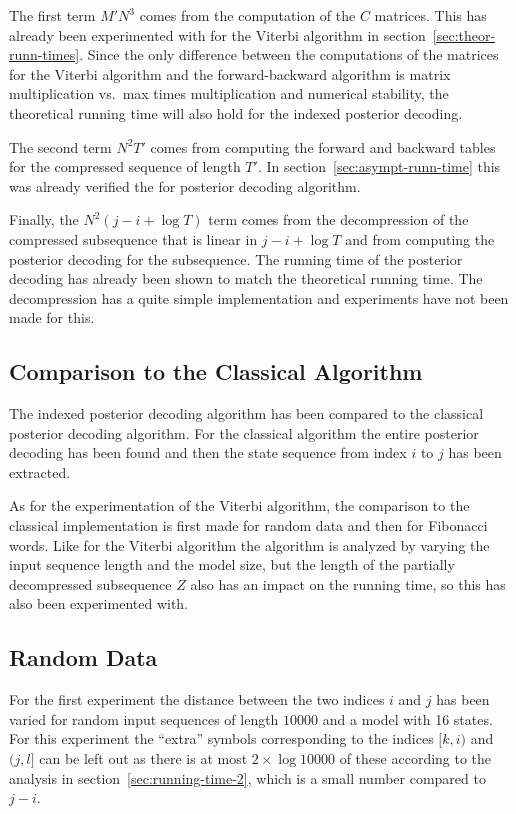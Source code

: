 The first term $M' N^3$ comes from the computation of the $C$ matrices. This
has already been experimented with for the Viterbi algorithm in
section~\ref{sec:theor-runn-times}. Since the only difference between the
computations of the matrices for the Viterbi algorithm and the forward-backward
algorithm is matrix multiplication vs.\ max times multiplication and numerical
stability, the theoretical running time will also hold for the indexed posterior
decoding.

The second term $N^2 T'$ comes from computing the forward and backward tables
for the compressed sequence of length $T'$. In
section~\ref{sec:asympt-runn-time} this was already verified the for posterior
decoding algorithm.

Finally, the $N^2 (j - i + \log T)$ term comes from the decompression of the
compressed subsequence that is linear in $j - i + \log T$ and from computing
the posterior decoding for the subsequence. The running time of the posterior
decoding has already been shown to match the theoretical running time. The
decompression has a quite simple implementation and experiments have not been
made for this. 

\subsection{Comparison to the Classical Algorithm}

The indexed posterior decoding algorithm has been compared to the classical
posterior decoding algorithm. For the classical algorithm the entire posterior
decoding has been found and then the state sequence from index $i$ to $j$ has
been extracted.

As for the experimentation of the Viterbi algorithm, the comparison to the
classical implementation is first made for random data and then for Fibonacci
words. Like for the Viterbi algorithm the algorithm is analyzed by varying the
input sequence length and the model size, but the length of the partially
decompressed subsequence $Z$ also has an impact on the running time, so this
has also been experimented with.

\subsection{Random Data}

For the first experiment the distance between the two indices $i$ and $j$ has
been varied for random input sequences of length $10000$ and a model with 16
states. For this experiment the ``extra'' symbols corresponding to the indices
$[k, i)$ and $(j, l]$ can be left out as there is at most $2 \times \log 10000$
of these according to the analysis in section~\ref{sec:running-time-2}, which
is a small number compared to $j - i$.

